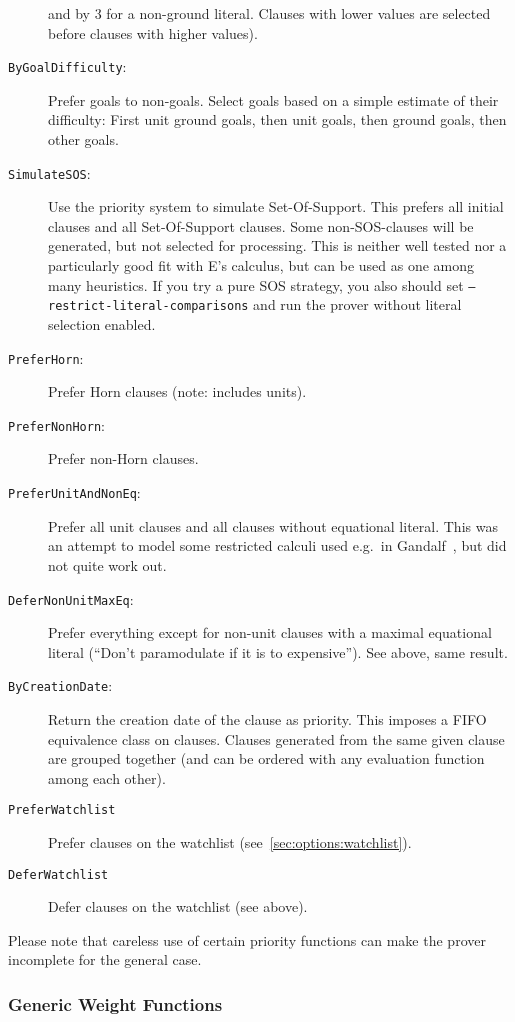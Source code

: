 \documentclass{report}
\begin{document}
\begin{description}
  and by 3 for a non-ground literal. Clauses with lower values are
  selected before clauses with higher values).
\item[\texttt{ByGoalDifficulty}:] Prefer goals to non-goals. Select
  goals based on a simple estimate of their difficulty: First unit
  ground goals, then unit goals, then ground goals, then other goals.
\item[\texttt{SimulateSOS}:] Use the priority system to simulate
  Set-Of-Support. This prefers all initial clauses and all
  Set-Of-Support clauses. Some non-SOS-clauses will be generated, but
  not selected for processing. This is neither well tested nor
  a particularly good fit with E's calculus, but can be used as one
  among many heuristics. If you try a pure SOS strategy, you also
  should set \texttt{--restrict-literal-comparisons} and run the
  prover without literal selection enabled.
\item[\texttt{PreferHorn}:] Prefer Horn clauses (note: includes units).
\item[\texttt{PreferNonHorn}:] Prefer non-Horn clauses.
\item[\texttt{PreferUnitAndNonEq}:] Prefer all unit clauses and all
  clauses without equational literal. This was an attempt to model
  some restricted calculi used e.g.~in Gandalf~\cite{Tammet:JAR-97},
  but did not quite work out.
\item[\texttt{DeferNonUnitMaxEq}:] Prefer everything except for
  non-unit clauses with a maximal equational literal (``Don't
  paramodulate if it is to expensive''). See above, same result.
\item[\texttt{ByCreationDate}:] Return the creation date of the clause
  as priority. This imposes a FIFO equivalence class on
  clauses. Clauses generated from the same given clause are grouped
  together (and can be ordered with any evaluation function among each
  other).
\item[\texttt{PreferWatchlist}] Prefer clauses on the watchlist
  (see~\ref{sec:options:watchlist}).
\item[\texttt{DeferWatchlist}] Defer clauses on the watchlist (see
  above).
\end{description}

Please note that careless use of certain priority functions can make
the prover incomplete for the general case.


\subsubsection{Generic Weight Functions}
\end{document}
